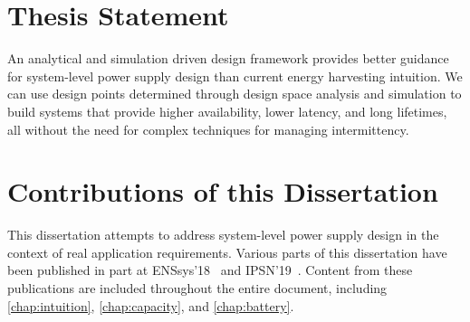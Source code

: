%
%


\section{Thesis Statement}
An analytical and simulation driven design framework provides better guidance for system-level power supply design than current energy harvesting intuition. We can use design points determined through design space analysis and simulation to build systems that provide higher availability, lower latency, and long lifetimes, all without the need for complex techniques for managing intermittency.

\section{Contributions of this Dissertation}
This dissertation attempts to address system-level power supply design in the context of real application requirements.
Various parts of this dissertation have been published in part at ENSsys'18~\cite{jackson2018reconsidering} and IPSN'19~\cite{jackson2019capacity}. Content from these publications are included throughout the entire document, including \cref{chap:intuition}, \cref{chap:capacity}, and \cref{chap:battery}. 

